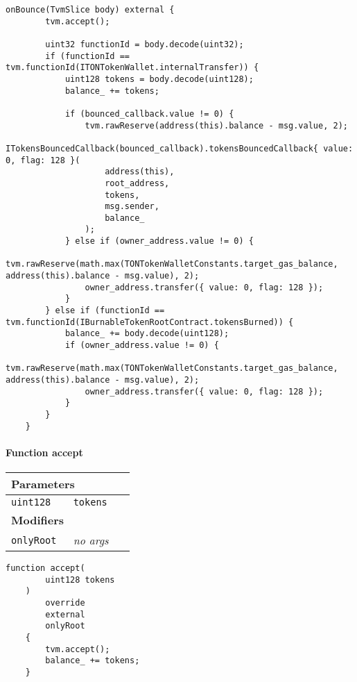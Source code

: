 \vspace{2cm}

\begin{lstlisting}[firstnumber=653]
    onBounce(TvmSlice body) external {
        tvm.accept();

        uint32 functionId = body.decode(uint32);
        if (functionId == tvm.functionId(ITONTokenWallet.internalTransfer)) {
            uint128 tokens = body.decode(uint128);
            balance_ += tokens;

            if (bounced_callback.value != 0) {
                tvm.rawReserve(address(this).balance - msg.value, 2);
                ITokensBouncedCallback(bounced_callback).tokensBouncedCallback{ value: 0, flag: 128 }(
                    address(this),
                    root_address,
                    tokens,
                    msg.sender,
                    balance_
                );
            } else if (owner_address.value != 0) {
                tvm.rawReserve(math.max(TONTokenWalletConstants.target_gas_balance, address(this).balance - msg.value), 2);
                owner_address.transfer({ value: 0, flag: 128 });
            }
        } else if (functionId == tvm.functionId(IBurnableTokenRootContract.tokensBurned)) {
            balance_ += body.decode(uint128);
            if (owner_address.value != 0) {
                tvm.rawReserve(math.max(TONTokenWalletConstants.target_gas_balance, address(this).balance - msg.value), 2);
                owner_address.transfer({ value: 0, flag: 128 });
            }
        }
    }
\end{lstlisting}

\paragraph{Function accept}


\ifsoltables
\noindent\begin{tabular}{|l|l|p{5cm}|}\hline
\multicolumn{3}{|l|}{\bf Parameters}\\\hline
\tt uint128 & \tt tokens &\\\hline
\multicolumn{3}{|l|}{\bf Modifiers}\\\hline
\tt onlyRoot & {\em no args} &\\\hline
\end{tabular}
\fi

\vspace{2cm}

\begin{lstlisting}[firstnumber=96]
    function accept(
        uint128 tokens
    )
        override
        external
        onlyRoot
    {
        tvm.accept();
        balance_ += tokens;
    }
\end{lstlisting}

